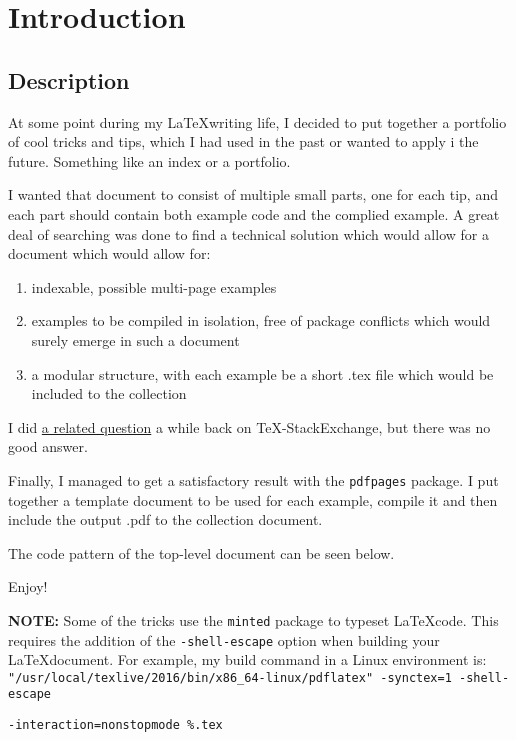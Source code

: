 \documentclass{article}
\begin{document}
	
	\section*{Introduction}
	
	\subsection*{Description}
	At some point during my \LaTeX writing life, I decided to put together a portfolio of cool tricks and tips, which I had used in the past or wanted to apply i the future. Something like an index or a portfolio.
	
	I wanted that document to consist of multiple small parts, one for each tip, and each part should contain both example code and the complied example. A great deal of searching was done to find a technical solution which would allow for a document which would allow for:
	\begin{enumerate}
		\item indexable, possible multi-page examples
		\item examples to be compiled in isolation, free of package conflicts which would surely emerge in such a document
		\item a modular structure, with each example be a short .tex file which would be included to the collection
	\end{enumerate}
	
	I did \href{http://tex.stackexchange.com/questions/316454/include-multiple-independent-snippets-of-latex-code}{a related question} a while back on TeX-StackExchange, but there was no good answer.
	
	Finally, I managed to get a satisfactory result with the \texttt{pdfpages} package. I put together a template document to be used for each example, compile it and then include the output .pdf to the collection document.
	
	The code pattern of the top-level document can be seen below.
	
	Enjoy!
	
	\textbf{NOTE:} Some of the tricks use the \verb|minted| package to typeset \LaTeX code. This requires the addition of the \texttt{-shell-escape} option when building your \LaTeX document.
	For example, my build command in a Linux environment is:\\
	\texttt{"/usr/local/texlive/2016/bin/x86\_64-linux/pdflatex" -synctex=1 -shell-escape}
	
	\hspace{4ex} \texttt{-interaction=nonstopmode \%.tex}
	
\end{document}
